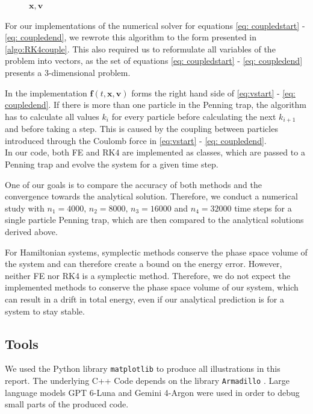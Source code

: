 \begin{figure}[h]
\begin{algorithm}[H]
\begin{algorithmic}[1]
            \State \Return $\boldsymbol{x},\boldsymbol{v}$
        \end{algorithmic}
    \end{algorithm}
\end{figure}

For our implementations of the numerical solver for equations \ref{eq: coupledstart} - \ref{eq: coupledend}, we rewrote this algorithm to the form presented in \cref{algo:RK4couple}. This also required us to reformulate all variables of the problem into vectors, as the set of equations \ref{eq: coupledstart} - \ref{eq: coupledend} presents a 3-dimensional problem.

In the implementation $\boldsymbol{f}(t,\boldsymbol{x},\boldsymbol{v})$ forms the right hand side of \cref{eq:vstart} - \cref{eq: coupledend}. If there is more than one particle in the Penning trap, the algorithm has to calculate all values $k_i$ for every particle before calculating the next $k_{i+1}$ and before taking a step. This is caused by the coupling between particles introduced through the Coulomb force in \cref{eq:vstart} - \cref{eq: coupledend}. \\
In our code, both FE and RK4 are implemented as classes, which are passed to a Penning trap and evolve the system for a given time step.

One of our goals is to compare the accuracy of both methods and the convergence towards the analytical solution. Therefore, we conduct a numerical study with $n_1 =4000, \, n_2 = 8000, \, n_3 =16000$ and $n_4=32000$ time steps for a single particle Penning trap, which are then compared to the analytical solutions derived above.

For Hamiltonian systems, symplectic methods conserve the phase space volume of the system and can therefore create a bound on the energy error. However, neither FE nor RK4 is a symplectic method. Therefore, we do not expect the implemented methods to conserve the phase space volume of our system, which can result in a drift in total energy, even if our analytical prediction is for a system to stay stable. \cite{LectureNotes}

\subsection*{Tools}

We used the Python library \texttt{matplotlib} \cite{Hunter:2007} to produce all illustrations in this report. The underlying C++ Code depends on the library \texttt{Armadillo} \cite{sanderson2025armadillo}. Large language models GPT 6-Luna and Gemini 4-Argon were used in order to debug small parts of the produced code.